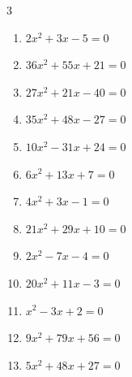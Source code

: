 \begin{multicols}{3}
\begin{enumerate}
  \item $2x^{2}+3x-5=0$


  \item $36x^{2}+55x+21=0$


  \item $27x^{2}+21x-40=0$


\columnbreak %

  \item $35x^{2}+48x-27=0$


  \item $10x^{2}-31x+24=0$


  \item $6x^{2}+13x+7=0$


  \item $4x^{2}+3x-1=0$


  \item $21x^{2}+29x+10=0$


  \item $2x^{2}-7x-4=0$


  \item $20x^{2}+11x-3=0$


  \item $x^{2}-3x+2=0$

        \phantom{$\displaystyle x=1,\; 2$}

  \item $9x^{2}+79x+56=0$


  \item $5x^{2}+48x+27=0$


\end{enumerate}
\end{multicols}
